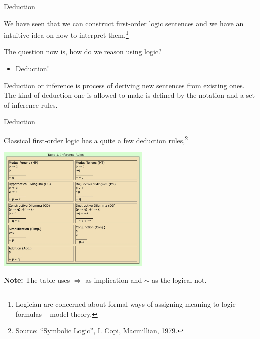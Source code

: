 \documentclass{beamer}
\begin{document}
\begin{frame}{Deduction}

We have seen that we can construct first-order logic sentences and we have an intuitive idea
on how to interpret them.\footnote{Logician are concerned about formal ways of assigning 
meaning to logic formulas -- model theory.}

\vspace{.1in}
The question now is, how do we reason using logic?
\begin{itemize}
\item Deduction!
\end{itemize}
Deduction or inference is process of deriving new sentences from existing ones.  
The kind of deduction one is allowed to make is defined by the notation and a set of inference rules.

\end{frame}

\begin{frame}{Deduction}

Classical first-order logic has a quite a few deduction rules,\footnote{Source: ``Symbolic Logic'', I. Copi, Macmillian, 1979.}

\begin{center}
    \includegraphics[height=60mm]{images/inference-rules}
\end{center}

{\bf Note:} The table uses $\Rightarrow$ as implication and $\sim$ as the logical not.

\end{frame}
\end{document}
